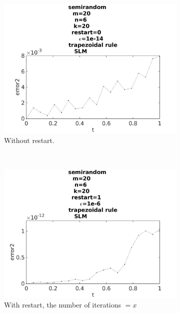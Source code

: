 \begin{figure}[H]
        \begin{subfigure}[b]{0.3\textwidth}
                \includegraphics[width=\textwidth]{../MATLAB/fig/errortestrestart0.jpg}
                \caption{ Without restart. }
                \label{fig:energytestrestart0}
        \end{subfigure}
        ~
        \begin{subfigure}[b]{0.3\textwidth}
                \includegraphics[width=\textwidth]{../MATLAB/fig/errortestrestart2.jpg}
                \caption{ With restart, the number of iterations $= x$ }
                \label{fig:energytestrestart2}
        \end{subfigure}
        ~
        \begin{subfigure}[b]{0.3\textwidth}

\end{subfigure}
\end{figure}
